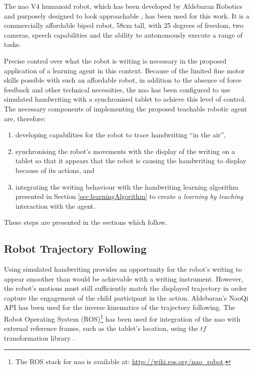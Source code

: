 \documentclass{sig-alternate}
\begin{document}
The {\sc nao} V4 humanoid robot, which has been developed by Aldebaran Robotics and 
purposely designed to look approachable \cite{Gouaillier2008}, has been used for
this work. It is a commercially affordable biped robot, 58cm tall, with 25
degrees of freedom, two cameras, speech capabilities and the ability to
autonomously execute a range of tasks.

Precise control over what the robot is writing is necessary in the
proposed application of a learning agent in this context. Because
of the limited fine motor skills possible with such an affordable robot, in
addition to the absence of force feedback and other technical necessities, the
{\sc nao} has been configured to use simulated handwriting with a synchronised tablet
to achieve this level of control. The necessary components of implementing the
proposed teachable robotic agent are, therefore:

\begin{enumerate}
    \item developing capabilities for the robot to trace handwriting ``in the air'', 

    \item synchronising the robot's movements with the display of the writing on a
        tablet so that it appears that the robot is causing the handwriting to
        display because of its actions, and

    \item integrating the writing behaviour with the handwriting learning
        algorithm presented in Section \ref{sec:learningAlgorithm} to create a
        \emph{learning by teaching} interaction with the agent. 
\end{enumerate}

These steps are presented in the sections which follow.

\subsection{Robot Trajectory Following}

Using simulated handwriting provides an opportunity for the robot's writing to
appear smoother than would be achievable with a writing instrument. However, the
robot's motions must still sufficiently match the displayed trajectory in order
capture the engagement of the child participant in the action. Aldebaran's NaoQi API
has been used for the inverse kinematics of the trajectory following. The Robot
Operating System (ROS)\footnote{The ROS stack for {\sc nao} is available at:
\url{http://wiki.ros.org/nao_robot}.} has been used for integration of the {\sc nao}
with external reference frames, such as the tablet's location, using the $tf$ transformation library \cite{Foote2013}.
\end{document}

